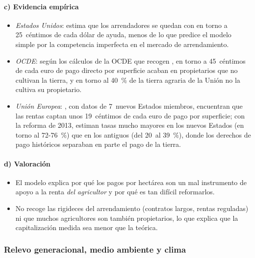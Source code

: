 \documentclass[11pt]{article}
\begin{document}
\paragraph{c) Evidencia empírica}

\begin{itemize}
\item \emph{Estados Unidos}: \textcite{Kirwan2009Incidence} estima que los arrendadores se quedan con en torno a 25~céntimos de cada dólar de ayuda, menos de lo que predice el modelo simple por la competencia imperfecta en el mercado de arrendamiento.
\item \emph{OCDE}: según los cálculos de la OCDE que recogen \textcite{BaldwinWyplosz2020Economics}, en torno a 45~céntimos de cada euro de pago directo por superficie acaban en propietarios que no cultivan la tierra, y en torno al 40~\% de la tierra agraria de la Unión no la cultiva su propietario\nocite{OCDE2003FarmIncome}.
\item \emph{Unión Europea}: \textcite{CiaianKancs2012Capitalisation}, con datos de 7~nuevos Estados miembros, encuentran que las rentas captan unos 19~céntimos de cada euro de pago por superficie; con la reforma de 2013, \textcite{CiaianKancsEspinosa2018} estiman tasas mucho mayores en los nuevos Estados (en torno al 72-76~\%) que en los antiguos (del 20~al 39~\%), donde los derechos de pago históricos separaban en parte el pago de la tierra.
\end{itemize}

\paragraph{d) Valoración}

\begin{itemize}
\item El modelo explica por qué los pagos por hectárea son un mal instrumento de apoyo a la renta \emph{del agricultor} y por qué es tan difícil reformarlos.
\item No recoge las rigideces del arrendamiento (contratos largos, rentas reguladas) ni que muchos agricultores son también propietarios, lo que explica que la capitalización medida sea menor que la teórica.
\end{itemize}

\subsubsection{Relevo generacional, medio ambiente y clima}\label{sec:relevo-ambiente}
\end{document}
